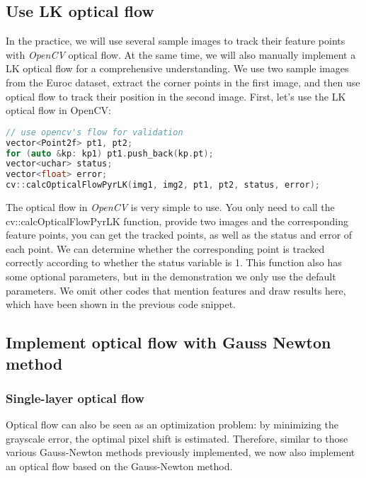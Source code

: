 %
\subsection{Use LK optical flow}
In the practice, we will use several sample images to track their feature points with \textit{OpenCV} optical flow. At the same time, we will also manually implement a LK optical flow for a comprehensive understanding. We use two sample images from the Euroc dataset, extract the corner points in the first image, and then use optical flow to track their position in the second image. First, let's use the LK optical flow in OpenCV:

\begin{lstlisting}[language=c++,caption=slambook2/ch8/optical_flow.cpp (snippet))]
// use opencv's flow for validation
vector<Point2f> pt1, pt2;
for (auto &kp: kp1) pt1.push_back(kp.pt);
vector<uchar> status;
vector<float> error;
cv::calcOpticalFlowPyrLK(img1, img2, pt1, pt2, status, error);
\end{lstlisting}

The optical flow in \textit{OpenCV} is very simple to use. You only need to call the cv::calcOpticalFlowPyrLK function, provide two images and the corresponding feature points, you can get the tracked points, as well as the status and error of each point. We can determine whether the corresponding point is tracked correctly according to whether the status variable is 1. This function also has some optional parameters, but in the demonstration we only use the default parameters. We omit other codes that mention features and draw results here, which have been shown in the previous code snippet.

\subsection{Implement optical flow with Gauss Newton method}
\subsubsection{Single-layer optical flow}
Optical flow can also be seen as an optimization problem: by minimizing the grayscale error, the optimal pixel shift is estimated. Therefore, similar to those various Gauss-Newton methods previously implemented, we now also implement an optical flow based on the Gauss-Newton method.

